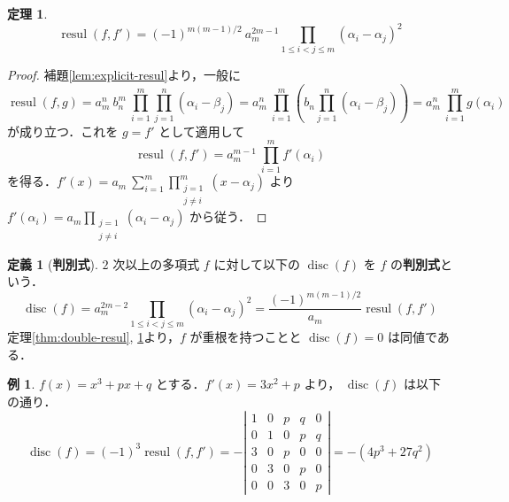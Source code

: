 \documentclass[12pt, uplatex, dvipdfmx]{jsarticle}
\newcommand{\ds}{\displaystyle}
\theoremstyle{definition}
\newtheorem{theorem}{定理}
\newtheorem*{definition}{定義}
\newtheorem{example}{例}
\DeclareMathOperator{\resul}{resul}
\DeclareMathOperator{\disc}{disc}
\begin{document}



\begin{theorem}\label{thm:resul-disc}
  \[
    \resul(f,f') = (-1)^{m(m-1)/2}\ a_m^{2m-1} \prod_{1 \leq i < j \leq m} (\alpha_i - \alpha_j)^2
  \]
\end{theorem}

\begin{proof}
  補題\ref{lem:explicit-resul}より，一般に
  \[
    \resul(f,g) = a_m^n \ b_n^m\ \prod_{i=1}^{m} \prod_{j=1}^{n} (\alpha_i-\beta_j)
    =a_m^n \ \prod_{i=1}^{m} \left( b_n \prod_{j=1}^{n}(\alpha_i-\beta_j)\right) = a_m^n\ \prod_{i=1}^{m} g(\alpha_i)
  \]
  が成り立つ．これを $g=f'$ として適用して
  \[
    \resul(f, f') = a_m^{m-1} \ \prod_{i=1}^{m} f'(\alpha_i)
  \]
  を得る．$\ds f'(x) = a_m\ \sum_{i=1}^{m} \prod_{\substack{j=1 \\ j \neq
      i}}^{m} (x-\alpha_j)$ より
  $\ds f'(\alpha_i) = a_m \prod_{\substack{j=1 \\ j \neq i}}
  (\alpha_i-\alpha_j)$ から従う．
\end{proof}

\begin{definition}[\textbf{判別式}] $2$ 次以上の多項式 $f$ に対して以下の $\disc(f)$ を $f$ の\textbf{判別式}という．
  \[
    \disc(f) = a_m^{2m-2} \prod_{1 \leq i < j \leq m} (\alpha_i-\alpha_j)^2 = \frac{(-1)^{m(m-1)/2}}{a_m} \resul(f,f')
  \]
  定理\ref{thm:double-resul}, \ref{thm:resul-disc}より，$f$ が重根を持つことと $\disc(f)=0$ は同値である．
\end{definition}

\begin{example}
  $f(x) = x^3+px+q$ とする．$f'(x) = 3x^2+p$ より， $\disc(f)$ は以下の通り．
  \[
    \disc(f) = (-1)^3 \resul(f,f') = -\left|
      \begin{array}{ccccc}
        1 & 0 & p & q & 0\\
        0 & 1 & 0 & p & q\\
        3 & 0 & p & 0 & 0\\
        0 & 3 & 0 & p & 0\\
        0 & 0 & 3 & 0 & p
      \end{array}
    \right| = -(4p^3+27q^2)
  \]
\end{example}
\end{document}
